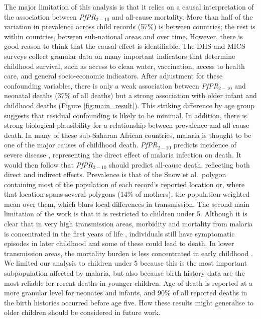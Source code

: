 \documentclass[12pt]{article}
\begin{document}
The major limitation of this analysis is that it relies on a causal interpretation of the association between \textit{PfPR}$_{2-10}$ and all-cause mortality. More than half of the variation in prevalence across child records (57\%) is between countries; the rest is within countries, between sub-national areas and over time. However, there is good reason to think that the causal effect is identifiable. The DHS and MICS surveys collect granular data on many important indicators that determine childhood survival, such as access to clean water, vaccination, access to health care, and general socio-economic indicators. After adjustment for these confounding variables, there is only a weak association between \textit{PfPR}$_{2-10}$ and neonatal deaths (37\% of all deaths) but a strong association with older infant and childhood deaths (Figure \ref{fig:main_result}). This striking difference by age group suggests that residual confounding is likely to be minimal. In addition, there is strong biological plausibility for a relationship between prevalence and all-cause death. In many of these sub-Saharan African countries, malaria is thought to be one of the major causes of childhood death. \textit{PfPR}$_{2-10}$ predicts incidence of severe disease \cite{Paton2021}, representing the direct effect of malaria infection on death. It would then follow that \textit{PfPR}$_{2-10}$ should predict all-cause death, reflecting both direct and indirect effects. Prevalence is that of the Snow et al.\ polygon containing most of the population of each record's reported location or, where that location spans several polygons (14\% of mothers), the population-weighted mean over them, which blurs local differences in transmission.
The second main limitation of the work is that it is restricted to children under 5.  Although it is clear that in very high transmission areas, morbidity and mortality from malaria is concentrated in the first years of life \cite{Kamau:22}, individuals still have symptomatic episodes in later childhood and some of these could lead to death. In lower transmission areas, the mortality burden is less concentrated in early childhood \cite{Carneiro:10}. We limited our analysis to children under 5 because this is the most important subpopulation affected by malaria, but also because birth history data are the most reliable for recent deaths in younger children. Age of death is reported at a more granular level for neonates and infants, and 90\% of all reported deaths in the birth histories occurred before age five. How these results might generalise to older children should be considered in future work.
\end{document}
